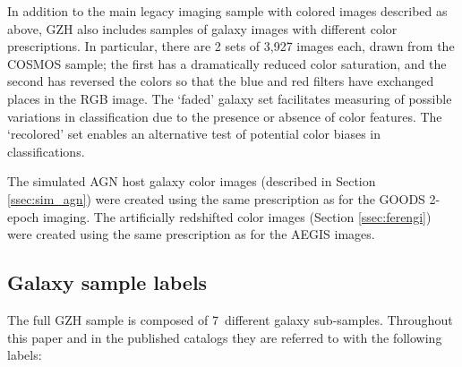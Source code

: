 \documentclass[twocolumn]{aastex6}
\begin{document}
In addition to the main \hst{} legacy imaging sample with colored images
described as above, GZH also includes samples of \hst{} galaxy images with
different color prescriptions. In particular, there are 2 sets of 3,927 images
each, drawn from the COSMOS sample; the first has a dramatically reduced color
saturation, and the second has reversed the colors so that the blue and red
filters have exchanged places in the RGB image. The `faded' galaxy set
facilitates measuring of possible variations in classification due to the
presence or absence of color features. The `recolored' set enables an
alternative test of potential color biases in classifications.

The simulated AGN host galaxy color images (described in Section \ref{ssec:sim_agn})
were created using the same prescription as for the GOODS 2-epoch imaging. The
artificially redshifted color images (Section \ref{ssec:ferengi}) were created using the
same prescription as for the AEGIS images.


\subsection{Galaxy sample labels}\label{ssec:sample_labels}

The full GZH sample is composed of 7~different galaxy sub-samples. Throughout
this paper and in the published catalogs they are referred to with the
following labels:
\end{document}
